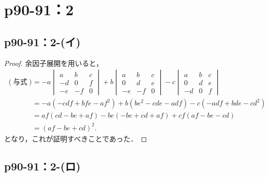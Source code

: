 \documentclass[a4paper,10pt,fleqn]{ltjsarticle}
\begin{document}
\section*{p90-91：2}

\subsection*{p90-91：2-(イ)}

\begin{tleftbar}
    \begin{proof}
        余因子展開を用いると，
        \begin{align*}
            (\text{与式}) & = -a \begin{vmatrix} a & b & c \\ -d & 0 &f \\ -e & -f & 0 \end{vmatrix} +b \begin{vmatrix} a & b & c \\ 0 & d & e \\ -e & -f & 0 \end{vmatrix} -c \begin{vmatrix} a & b & c \\ 0 & d & e \\ -d & 0 & f \end{vmatrix} \\
                        & = -a (-cdf +bfe-af^2)+b(be^2-cde-adf)-c(-adf+bde-cd^2)                                                                                                                                                                \\
                        & = af (cd-be+af) -be(-be+cd+af) +cf(af-be-cd)                                                                                                                                                                          \\
                        & = (af-be+cd)^2.
        \end{align*}
        となり，これが証明すべきことであった．
    \end{proof}
\end{tleftbar}

\subsection*{p90-91：2-(ロ)}
\end{document}
